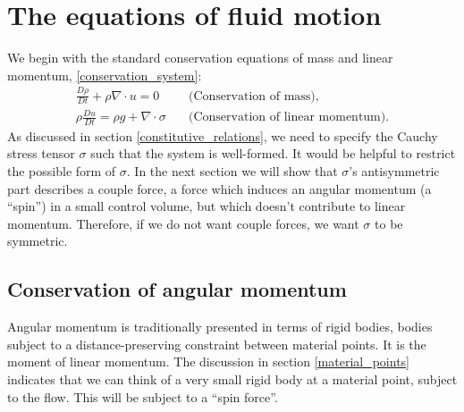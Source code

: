 \section{The equations of fluid motion}
We begin with the standard conservation equations of mass and linear momentum, \eqref{conservation_system}:
\begin{equation}\label{compressible_system}
\begin{split}
    \frac{D\rho}{Dt} + \rho\nabla\cdot u = 0 &\quad\text{(Conservation of mass)},
    \\
    \rho\frac{Du}{Dt} = \rho g + \nabla\cdot\sigma &\quad\text{(Conservation of linear momentum)}.
\end{split}
\end{equation}
As discussed in section \ref{constitutive_relations}, we need to specify the Cauchy stress tensor $\sigma$ such that the system is well-formed.
It would be helpful to restrict the possible
form of $\sigma$. In the next section we will show that $\sigma$'s antisymmetric part describes a couple force, a force which induces an angular
momentum (a ``spin'') in a small control volume, but which doesn't contribute to linear momentum. Therefore, if we do not want couple forces,
we want $\sigma$ to be symmetric.
\subsection{Conservation of angular momentum}
Angular momentum is traditionally presented in terms of rigid bodies, bodies subject to a distance-preserving constraint between
material points. It is the moment of linear momentum.
The discussion in section \ref{material_points} indicates that we can think of a very small rigid body at a material point, subject to the flow.
This will be subject to a ``spin force''.

